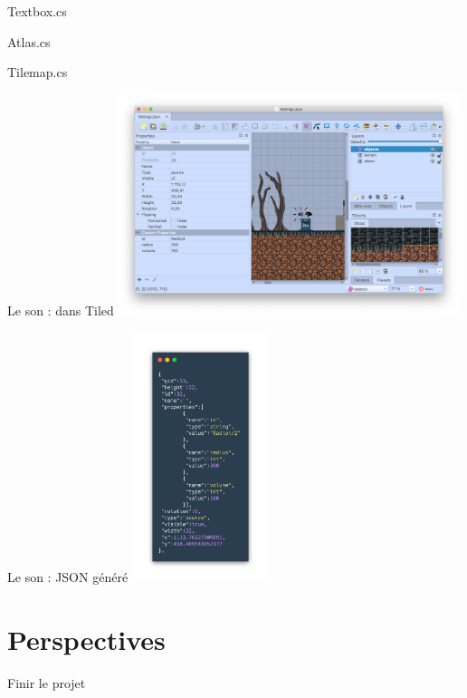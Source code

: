 \documentclass{beamer}
\begin{document}
\begin{frame}{Textbox.cs}
  
\end{frame}

\begin{frame}{Atlas.cs}
  
\end{frame}

\begin{frame}{Tilemap.cs}
  
\end{frame}

\begin{frame}{Le son : dans Tiled}
    \centering
    \includegraphics[width=10cm]{assets/tiledSon}
\end{frame}

\begin{frame}{Le son : JSON généré}
    \centering
    \includegraphics[width=4cm]{assets/jsonSource}
\end{frame}

\section{Perspectives}

\begin{frame}{Finir le projet}
  
\end{frame}
\end{document}
